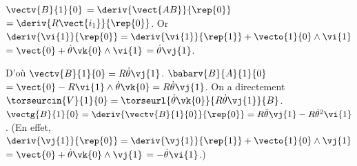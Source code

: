 \begin{corrigebox}
$\vectv{B}{1}{0}$ $ = \deriv{\vect{AB}}{\rep{0}}$ $=\deriv{R\vect{i_1}}{\rep{0}}$.
Or $\deriv{\vi{1}}{\rep{0}} = \deriv{\vi{1}}{\rep{1}} + \vecto{1}{0}\wedge \vi{1} $ $=\vect{0}+\dot{\theta}\vk{0}\wedge \vi{1}$ $=\dot{\theta}\vj{1}$.

D'où $\vectv{B}{1}{0}=R\dot{\theta}\vj{1}$.
$\babarv{B}{A}{1}{0}$ $=\vect{0}-R\vi{1}\wedge \dot{\theta}\vk{0} =R\dot{\theta}\vj{1} $.
On a directement $\torseurcin{V}{1}{0} = \torseurl{\dot{\theta}\vk{0}}{R\dot{\theta}\vj{1}}{B}$.
$\vectg{B}{1}{0} = \deriv{\vectv{B}{1}{0}}{\rep{0}}=R\ddot{\theta}\vj{1}-R\dot{\theta}^2\vi{1}$.
(En effet,  $\deriv{\vj{1}}{\rep{0}} = \deriv{\vj{1}}{\rep{1}} + \vecto{1}{0}\wedge \vj{1} $ $=\vect{0}+\dot{\theta}\vk{0}\wedge \vj{1}$ $=-\dot{\theta}\vi{1}$.)
\end{corrigebox}
